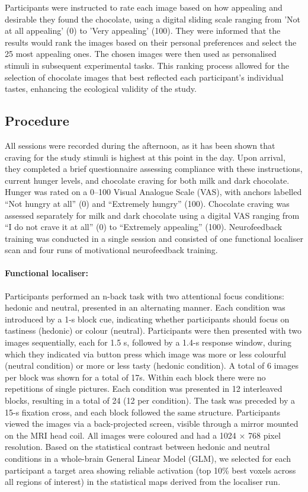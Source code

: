 \documentclass[]{imag-ms-template}
\begin{document}
Participants were instructed to rate each image based on how appealing and desirable they found the chocolate, using a digital sliding scale ranging from 'Not at all appealing' (0) to 'Very appealing' (100). They were informed that the results would rank the images based on their personal preferences and select the 25 most appealing ones. The chosen images were then used as personalised stimuli in subsequent experimental tasks. This ranking process allowed for the selection of chocolate images that best reflected each participant’s individual tastes, enhancing the ecological validity of the study.

\subsection{Procedure}
All sessions were recorded during the afternoon, as it has been shown that craving for the study stimuli is highest at this point in the day. Upon arrival, they completed a brief questionnaire assessing compliance with these instructions, current hunger levels, and chocolate craving for both milk and dark chocolate. Hunger was rated on a 0–100 Visual Analogue Scale (VAS), with anchors labelled “Not hungry at all” (0) and “Extremely hungry” (100). Chocolate craving was assessed separately for milk and dark chocolate using a digital VAS ranging from “I do not crave it at all” (0) to “Extremely appealing” (100). Neurofeedback training was conducted in a single session and consisted of one functional localiser scan and four runs of motivational neurofeedback training.

\paragraph{Functional localiser:}Participants performed an n-back task with two attentional focus conditions: hedonic and neutral, presented in an alternating manner. Each condition was introduced by a 1-s block cue, indicating whether participants should focus on tastiness (hedonic) or colour (neutral). Participants were then presented with two images sequentially, each for 1.5 s, followed by a 1.4-s response window, during which they indicated via button press which image was more or less colourful (neutral condition) or more or less tasty (hedonic condition). A total of 6 images per block was shown for a total of 17s. Within each block there were no repetitions of single pictures. Each condition was presented in 12 interleaved blocks, resulting in a total of 24 (12 per condition). The task was preceded by a 15-s fixation cross, and each block followed the same structure. Participants viewed the images via a back-projected screen, visible through a mirror mounted on the MRI head coil. All images were coloured and had a 1024 × 768 pixel resolution. Based on the statistical contrast between hedonic and neutral conditions in a whole-brain General Linear Model (GLM), we selected for each participant a target area showing reliable activation (top 10\% best voxels across all regions of interest) in the statistical maps derived from the localiser run.
\end{document}
